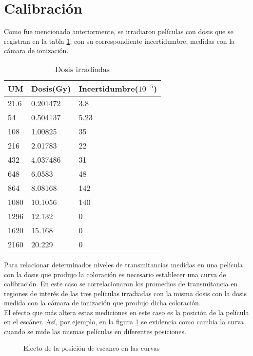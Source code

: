 
\section{Calibración}
Como fue mencionado anteriormente, se irradiaron películas con dosis que se registran en la tabla \ref{tab:DosisIrra}, con su correspondiente incertidumbre, medidas con la cámara de ionización.

\begin{table}[]
	\centering
	\begin{tabular}{|l|l|l|}
		\hline
		UM& Dosis(Gy)    & Incertidumbre($10^{-5}$) \\ \hline
		21.6&0.201472 & 3.8           \\ \hline
		54&0.504137 & 5.23          \\ \hline
		108&1.00825  & 35            \\ \hline
		216&2.01783  & 22            \\ \hline
		432&4.037486 & 31            \\ \hline
		648&6.0583   & 48            \\ \hline
		864&8.08168  & 142           \\ \hline
		1080&10.1056  & 140           \\ \hline
		1296&12.132   & 0             \\ \hline
		1620&15.168   & 0             \\ \hline
		2160&20.229   & 0             \\ \hline
	\end{tabular}
	\caption{Dosis irradiadas}
	\label{tab:DosisIrra}
\end{table}

Para relacionar determinados niveles de transmitancias medidas en una película con la dosis que produjo la coloración es necesario establecer una curva de calibración. En este caso se correlacionaron los promedios de transmitancia en regiones de interés de las tres películas irradiadas con la misma dosis con la dosis medida con la cámara de ionización que produjo dicha coloración.\\

El efecto que más altera estas mediciones en este caso es la posición de la película en el escáner. Así, por ejemplo, en la figura \ref{fig:curvasDezplazadas} se evidencia como cambia la curva cuando se mide las mismas películas en diferentes posiciones.\\

\begin{figure}
	\centering
	
	\caption{Efecto de la posición de escaneo en las curvas }
	\label{fig:curvasDezplazadas}
\end{figure}

